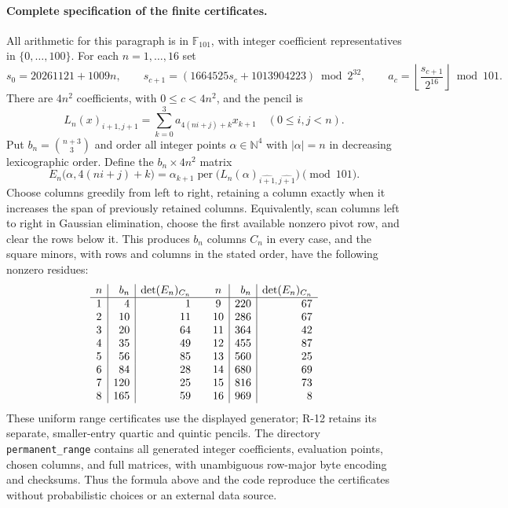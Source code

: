 \paragraph{Complete specification of the finite certificates.}
All arithmetic for this paragraph is in $\mathbb F_{101}$, with
integer coefficient representatives in $\{0,\ldots,100\}$.
For each $n=1,\ldots,16$ set
\[
 s_0=20261121+1009n,\qquad
 s_{c+1}=(1664525s_c+1013904223)\bmod2^{32},\qquad
 a_c=\left\lfloor\frac{s_{c+1}}{2^{16}}\right\rfloor\bmod101.
\]
There are $4n^2$ coefficients, with $0\leq c<4n^2$, and the
pencil is
\[
 L_n(x)_{i+1,j+1}=\sum_{k=0}^3a_{4(ni+j)+k}x_{k+1}
 \quad(0\leq i,j<n).
\]
Put $b_n=\binom{n+3}{3}$ and order all integer points
$\alpha\in\mathbb N^4$ with $|\alpha|=n$ in decreasing
lexicographic order. Define the $b_n\times4n^2$ matrix
\begin{equation}\label{R13:evaluationmatrix}
 E_n\bigl(\alpha,4(ni+j)+k\bigr)
 =\alpha_{k+1}\operatorname{per}
   \bigl(L_n(\alpha)_{\widehat{i+1},\widehat{j+1}}\bigr)
 \pmod{101}.
\end{equation}
Choose columns greedily from left to right, retaining a column
exactly when it increases the span of previously retained columns.
Equivalently, scan columns left to right in Gaussian elimination,
choose the first available nonzero pivot row, and clear the rows
below it. This produces $b_n$ columns $C_n$ in every case, and the
square minors, with rows and columns in the stated order, have
the following nonzero residues:
\[
\begin{array}{c|r|r@{\qquad}c|r|r}
n&b_n&\det(E_n)_{C_n}&n&b_n&\det(E_n)_{C_n}\\\hline
1&4&1&9&220&67\\
2&10&11&10&286&67\\
3&20&64&11&364&42\\
4&35&49&12&455&87\\
5&56&85&13&560&25\\
6&84&28&14&680&69\\
7&120&25&15&816&73\\
8&165&59&16&969&8
\end{array}
\]
These uniform range certificates use the displayed generator;
R-12 retains its separate, smaller-entry quartic and quintic pencils.
The directory \texttt{permanent\_range} contains all generated
integer coefficients, evaluation points, chosen columns, and full
matrices, with unambiguous row-major byte encoding and checksums.
Thus the formula above and the code reproduce the certificates
without probabilistic choices or an external data source.

